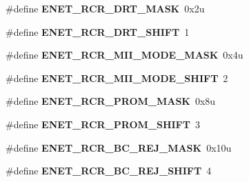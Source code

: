 \begin{DoxyCompactItemize}
\item 
\#define {\bfseries E\+N\+E\+T\+\_\+\+R\+C\+R\+\_\+\+D\+R\+T\+\_\+\+M\+A\+SK}~0x2u\hypertarget{group__ENET__Register__Masks_ga58442922cdcafe3b6d538552b38f4899}{}\label{group__ENET__Register__Masks_ga58442922cdcafe3b6d538552b38f4899}

\item 
\#define {\bfseries E\+N\+E\+T\+\_\+\+R\+C\+R\+\_\+\+D\+R\+T\+\_\+\+S\+H\+I\+FT}~1\hypertarget{group__ENET__Register__Masks_ga6fd2d01580d2b9cbe640d0af201ea723}{}\label{group__ENET__Register__Masks_ga6fd2d01580d2b9cbe640d0af201ea723}

\item 
\#define {\bfseries E\+N\+E\+T\+\_\+\+R\+C\+R\+\_\+\+M\+I\+I\+\_\+\+M\+O\+D\+E\+\_\+\+M\+A\+SK}~0x4u\hypertarget{group__ENET__Register__Masks_ga117cf78ff620b783e4dc4156ad1a735b}{}\label{group__ENET__Register__Masks_ga117cf78ff620b783e4dc4156ad1a735b}

\item 
\#define {\bfseries E\+N\+E\+T\+\_\+\+R\+C\+R\+\_\+\+M\+I\+I\+\_\+\+M\+O\+D\+E\+\_\+\+S\+H\+I\+FT}~2\hypertarget{group__ENET__Register__Masks_gaef1228d5d365350c81bf4bf641ad3dd4}{}\label{group__ENET__Register__Masks_gaef1228d5d365350c81bf4bf641ad3dd4}

\item 
\#define {\bfseries E\+N\+E\+T\+\_\+\+R\+C\+R\+\_\+\+P\+R\+O\+M\+\_\+\+M\+A\+SK}~0x8u\hypertarget{group__ENET__Register__Masks_gac7ad0640855d497207c29e8558341616}{}\label{group__ENET__Register__Masks_gac7ad0640855d497207c29e8558341616}

\item 
\#define {\bfseries E\+N\+E\+T\+\_\+\+R\+C\+R\+\_\+\+P\+R\+O\+M\+\_\+\+S\+H\+I\+FT}~3\hypertarget{group__ENET__Register__Masks_gabd47b61ac9aecad49dd266ff3421b98f}{}\label{group__ENET__Register__Masks_gabd47b61ac9aecad49dd266ff3421b98f}

\item 
\#define {\bfseries E\+N\+E\+T\+\_\+\+R\+C\+R\+\_\+\+B\+C\+\_\+\+R\+E\+J\+\_\+\+M\+A\+SK}~0x10u\hypertarget{group__ENET__Register__Masks_gaf7ca1d57cd7888b1cb6e0d6834eeba06}{}\label{group__ENET__Register__Masks_gaf7ca1d57cd7888b1cb6e0d6834eeba06}

\item 
\#define {\bfseries E\+N\+E\+T\+\_\+\+R\+C\+R\+\_\+\+B\+C\+\_\+\+R\+E\+J\+\_\+\+S\+H\+I\+FT}~4\hypertarget{group__ENET__Register__Masks_gafbd6d9ebd1bfe9b4271864e5148765ba}{}\label{group__ENET__Register__Masks_gafbd6d9ebd1bfe9b4271864e5148765ba}


\end{DoxyCompactItemize}
